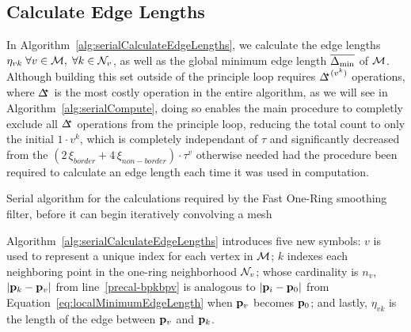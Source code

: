 \subsection{Calculate Edge Lengths}
In Algorithm~\ref{alg:serialCalculateEdgeLengths}, we calculate the edge lengths $\eta_{vk} \; \forall v \in \mathcal{M}, \; \forall  k \in \mathcal{N}_v$, as well as the global minimum edge length $\overline{\Delta_\text{min}}$ of $\mathcal{M}$. Although building this set outside of the principle loop requires ${\Delta^{\kern-3pt\star}}^{(v^k)}$ operations, where $\Delta^{\kern-3pt\star}$ is the most costly operation in the entire algorithm, as we will see in Algorithm~\ref{alg:serialCompute}, doing so enables the main procedure to completly exclude all $\Delta^{\kern-3pt\star}$ operations from the principle loop, reducing the total count to only the initial $1\cdot v^k$, which is completely independant of $\tau$ and significantly decreased from the ${(2\,\xi_{border} + 4\,\xi_{non-border})\cdot\tau^v}$ otherwise needed had the procedure been required to calculate an edge length each time it was used in computation.
%
%
\begin{algorithm}
	\DontPrintSemicolon


	\bigskip
	\;
\nl	{}
	\caption{Serial algorithm for the calculations required by the Fast One-Ring smoothing filter, before it can begin iteratively convolving a mesh\label{alg:serialCalculateEdgeLengths}}
\end{algorithm}%
%
%
%

Algorithm~\ref{alg:serialCalculateEdgeLengths} introduces five new symbols: $v$ is used to represent a unique index for each vertex in $\mathcal{M}$; $k$ indexes each neighboring point in the one-ring neighborhood $\mathcal{N}_v$; whose cardinality is $n_v$, $|\mathbf{p}_k-\mathbf{p}_v|$ from line~\ref{precal-bpkbpv} is analogous to $|\mathbf{p}_i-\mathbf{p}_0|$ from Equation~\ref{eq:localMinimumEdgeLength} when $\mathbf{p}_v$ becomes $\mathbf{p}_0$; and lastly, $\eta_{vk}$ is the length of the edge between $\mathbf{p}_v$ and $\mathbf{p}_k$.%
%
